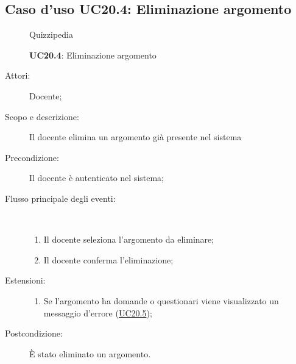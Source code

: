 \subsection{Caso d'uso UC20.4: Eliminazione argomento}
\begin{figure}[H]
	\centering
	\begin{resizedtikzpicture}{\textwidth}
		\begin{umlsystem}[x=0, fill=lightgray!20]{Quizzipedia}
		\end{umlsystem}
	\end{resizedtikzpicture}
	\caption{\textbf{UC20.4}: Eliminazione argomento}
	\label{UC20.4}
\end{figure}
\begin{description}
	\item[Attori:] Docente;
	\item[Scopo e descrizione:] Il docente elimina un argomento già presente nel sistema
	\item[Precondizione:] Il docente è autenticato nel sistema;
	
	\item[Flusso principale degli eventi:] \ 
	\begin{enumerate}
		\item Il docente seleziona l'argomento da eliminare;
		\item Il docente conferma l'eliminazione;
		
	\end{enumerate}
	\item[Estensioni:]
	\begin{enumerate}
		\item Se l'argomento ha domande o questionari viene visualizzato un messaggio d'errore (\hyperlink{UC20.5}{UC20.5});
		
	\end{enumerate}
	\item[Postcondizione:] È stato eliminato un argomento.
\end{description}
\hypertarget{UC20.5}{}
